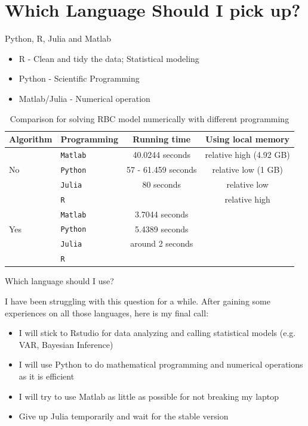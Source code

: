 \documentclass[handout]{beamer} %
\begin{document}
\section{Which Language Should I pick up?}

\begin{frame}{Python, R, Julia and Matlab}
	\begin{itemize}
		\item R - Clean and tidy the data; Statistical modeling
		\item Python - Scientific Programming 
		\item Matlab/Julia - Numerical operation
	\end{itemize}
\begin{table}
	\centering
	\begin{tabular}{llcc}
	\toprule 
	Algorithm	& Programming & Running time & Using local memory \\
	\hline 
		&\texttt{Matlab} & 40.0244 seconds & relative high (4.92 GB)\\
		No &\texttt{Python} & 57 - 61.459 seconds & relative low (1 GB)\\
		&\texttt{Julia} & 80 seconds & relative low \\
		& \texttt{R} & & relative high\\
		\hline 
		& \texttt{Matlab} & 3.7044 seconds & \\
	Yes & \texttt{Python} & 5.4389 seconds & \\
	    & \texttt{Julia} & around 2 seconds & \\
	    & \texttt{R} & \\
	    \hline 
	    \hline 
	\end{tabular}
	\caption{Comparison for solving RBC model numerically with different programming}
\end{table}
\end{frame}

\begin{frame}{Which language should I use?}

	I have been struggling with this question for a while. After gaining some experiences on all those languages, here is my final call:
	\begin{itemize}
	\setlength\itemsep{1em}
		\item I will stick to Rstudio for data analyzing and calling statistical models (e.g. VAR, Bayesian Inference) 
		\item I will use Python to do mathematical programming and numerical operations as it is efficient
		\item I will try to use Matlab as little as possible for not breaking my laptop 
		\item Give up Julia temporarily and wait for the stable version
	\end{itemize}
\end{frame}
\end{document}
